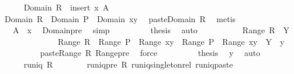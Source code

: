 \begin{isabellebody}
\ \ \ \ \isamarkupfalse%
\ {\isachardoublequoteopen}Domain\ R\ {\isacharequal}\ insert\ x\ A{\isachardoublequoteclose}\isanewline
\ \ \ \ \isamarkupfalse%
\ {\isacharminus}\isanewline
\ \ \ \ \ \ \isamarkupfalse%
\ {\isachardoublequoteopen}Domain\ R\ {\isacharequal}\ Domain\ P\ {\isasymunion}\ Domain\ {\isacharbraceleft}{\isacharparenleft}x{\isacharcomma}y{\isacharparenright}{\isacharbraceright}{\isachardoublequoteclose}\ \isamarkupfalse%
\ paste{\isacharunderscore}Domain\ R\ \isamarkupfalse%
\ metis\isanewline
\ \ \ \ \ \ \isamarkupfalse%
\ \isamarkupfalse%
\ {\isachardoublequoteopen}{\isasymdots}\ {\isacharequal}\ A\ {\isasymunion}\ {\isacharbraceleft}x{\isacharbraceright}{\isachardoublequoteclose}\ \isamarkupfalse%
\ Domain{\isacharunderscore}pre\ \isamarkupfalse%
\ simp\isanewline
\ \ \ \ \ \ \isamarkupfalse%
\ \isamarkupfalse%
\ {\isacharquery}thesis\ \isamarkupfalse%
\ auto\isanewline
\ \ \ \ \isamarkupfalse%
\isanewline
\isanewline
\ \ \ \ \isamarkupfalse%
\ {\isachardoublequoteopen}Range\ R\ {\isasymsubseteq}\ Y{\isachardoublequoteclose}\isanewline
\ \ \ \ \isamarkupfalse%
\ {\isacharminus}\isanewline
\ \ \ \ \ \ \isamarkupfalse%
\ {\isachardoublequoteopen}Range\ R\ {\isasymsubseteq}\ Range\ P\ {\isasymunion}\ Range\ {\isacharbraceleft}{\isacharparenleft}x{\isacharcomma}y{\isacharparenright}{\isacharbraceright}\ {\isasymand}\ Range\ P\ {\isasymunion}\ Range\ {\isacharbraceleft}{\isacharparenleft}x{\isacharcomma}y{\isacharparenright}{\isacharbraceright}\ {\isasymsubseteq}\ Y\ {\isasymunion}\ {\isacharbraceleft}y{\isacharbraceright}{\isachardoublequoteclose}\isanewline
\ \ \ \ \ \ \ \ \isamarkupfalse%
\ paste{\isacharunderscore}Range\ R\ Range{\isacharunderscore}pre\ \isamarkupfalse%
\ force\isanewline
\ \ \ \ \ \ \isamarkupfalse%
\ \isamarkupfalse%
\ {\isacharquery}thesis\ \isamarkupfalse%
\ y\ \isamarkupfalse%
\ auto\isanewline
\ \ \ \ \isamarkupfalse%
\isanewline
\isanewline
\ \ \ \ \isamarkupfalse%
\ {\isachardoublequoteopen}runiq\ R{\isachardoublequoteclose}\isanewline
\ \ \ \ \ \ \isamarkupfalse%
\ runiq{\isacharunderscore}pre\ R\ runiq{\isacharunderscore}singleton{\isacharunderscore}rel\ runiq{\isacharunderscore}paste{}\ \isamarkupfalse%

\end{isabellebody}
